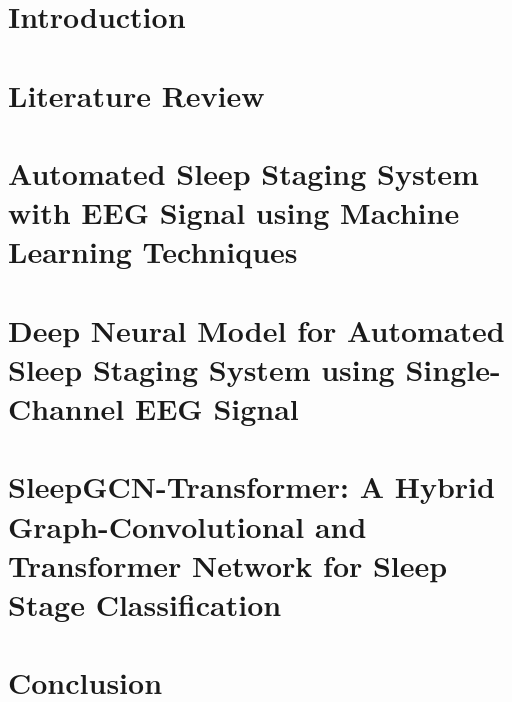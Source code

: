 \documentclass[12pt,a4paper]{report}
\begin{document}
	\pagestyle{plain}\clearpage
        \thispagestyle{empty}
	

         \pagestyle{plain}\clearpage
        \thispagestyle{empty}
	
      



        
	\thispagestyle{empty}
	
	\clearpage\thispagestyle{empty}

\clearpage\thispagestyle{empty}
	
	\thispagestyle{empty}
 
	
	\thispagestyle{empty}
	
        	\tableofcontents
	\listoffigures
	\listoftables
 
    
	\cleardoublepage{}
	\pagestyle{fancy}

	\chapter[Introduction]{Introduction}
	\label{chapter1}
	
	
	\chapter[Literature Review]{Literature Review}
	\label{chapter2}
	
	

\chapter{Automated Sleep Staging System with EEG Signal using Machine Learning Techniques}
\label{chapter_paper1}


\chapter{Deep Neural Model for Automated Sleep Staging System using Single-Channel EEG Signal}
\label{chapter_paper2}


\chapter{SleepGCN-Transformer: A Hybrid Graph-Convolutional and Transformer Network for Sleep Stage Classification}
\label{chapter_paper3}

	
	\chapter[Conclusion]{Conclusion}
	\pagestyle{plain}
 

 
	 




 
        \clearpage\thispagestyle{empty}
\end{document}
